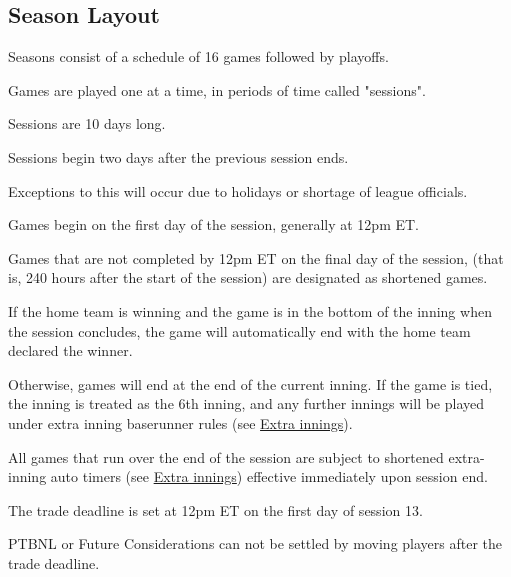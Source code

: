 
\subsection{Season Layout}
\begin{deepEnumerate}
	\item Seasons consist of a schedule of 16 games followed by playoffs.
	\item Games are played one at a time, in periods of time called "sessions".
	\begin{deepEnumerate}
		\item Sessions are 10 days long.
		\item Sessions begin two days after the previous session ends.
		\begin{deepEnumerate}
			\item Exceptions to this will occur due to holidays or shortage of league officials.
		\end{deepEnumerate}
		\item Games begin on the first day of the session, generally at 12pm ET.
		\item Games that are not completed by 12pm ET on the final day of the session,
		(that is, 240 hours after the start of the session)
		are designated as shortened games.
		\begin{deepEnumerate}
			\item If the home team is winning 
			and the game is in the bottom of the inning
			when the session concludes,
			the game will automatically end with the home team declared the winner.
			\item Otherwise, games will end at the end of the current inning.
			If the game is tied, the inning is treated as the 6th inning,
			and any further innings will be played under extra inning baserunner rules
			(see \hyperref[sec:extra innings]{Extra innings}).
			\item All games that run over the end of the session 
			are subject to shortened extra-inning auto timers
			(see \hyperref[sec:extra innings]{Extra innings}) 
			effective immediately upon session end.
		\end{deepEnumerate}
		\item The trade deadline is set at 12pm ET on the first day of session 13.
		\begin{deepEnumerate}
			\item PTBNL or Future Considerations can not be settled by moving players after the trade deadline.

\end{deepEnumerate}
\end{deepEnumerate}
\end{deepEnumerate}
